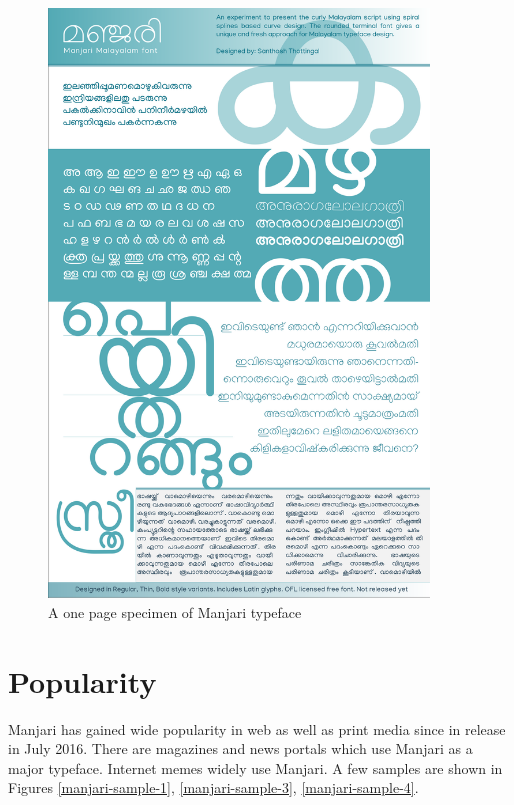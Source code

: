 \documentclass[11pt,twoside,a4paper,parskip=full]{scrartcl}
\begin{document}
\begin{figure}[h!]
\includegraphics[width=0.9\textwidth]{images/Manjari-Specimen.pdf}
	\caption{A one page specimen of Manjari typeface}
\label{specimen}
\end{figure}
\clearpage

\section{Popularity}

Manjari has gained wide popularity in web as well as print media since in release in July 2016. There are magazines and news portals which use Manjari as a major typeface. Internet memes widely use Manjari. A few samples are shown in Figures \ref{manjari-sample-1}, \ref{manjari-sample-3}, \ref{manjari-sample-4}. 
\end{document}
